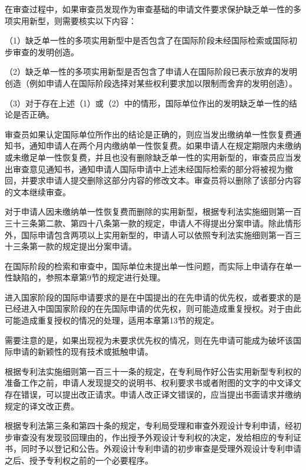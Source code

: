 在审查过程中，如果审查员发现作为审查基础的申请文件要求保护缺乏单一性的多项实用新型，则需要核实以下内容：

{\setlength{\parindent}{17.1bp}（1）缺乏单一性的多项实用新型中是否包含了在国际阶段未经国际检索或国际初步审查的发明创造。\par}

{\setlength{\parindent}{17.1bp}（2）缺乏单一性的多项实用新型是否包含了申请人在国际阶段已表示放弃的发明创造（例如申请人在国际阶段选择对某些权利要求加以限制而舍弃的发明创造）。\par}

{\setlength{\parindent}{17.1bp}（3）对于存在上述（1）或（2）中的情形，国际单位作出的发明缺乏单一性的结论是否正确。\par}

审查员如果认定国际单位所作出的结论是正确的，则应当发出缴纳单一性恢复费通知书，通知申请人在两个月内缴纳单一性恢复费。如果申请人在规定期限内未缴纳或未缴足单一性恢复费，并且也没有删除缺乏单一性的实用新型的，审查员应当发出审查意见通知书，通知申请人国际申请中上述未经国际检索的部分将被视为撤回，并要求申请人提交删除这部分内容的修改文本。审查员将以删除了该部分内容的文本继续审查。

对于申请人因未缴纳单一性恢复费而删除的实用新型，根据专利法实施细则第一百三十三条第二款、第四十八条第一款的规定，申请人不得提出分案申请。除此情形外，国际申请包含两项以上实用新型的，申请人可以依照专利法实施细则第一百三十三条第一款的规定提出分案申请。

在国际阶段的检索和审查中，国际单位未提出单一性问题，而实际上申请存在单一性缺陷的，参照本章第9节的规定进行处理。

进入国家阶段的国际申请要求的是在中国提出的在先申请的优先权，或者要求的是已经进入中国国家阶段的在先国际申请的优先权，则可能造成重复授权。对于由此可能造成重复授权的情况的处理，适用本章第13节的规定。

需要注意的是，如果出现视为未要求优先权的情况，则在先申请可能成为破坏该国际申请的新颖性的现有技术或抵触申请。

根据专利法实施细则第一百三十一条的规定，在专利局作好公告实用新型专利权的准备工作之前，申请人发现提交的说明书、权利要求书或者附图的文字的中文译文存在错误，可以提出改正请求。申请人改正译文错误的，应当提出书面请求并缴纳规定的译文改正费。

根据专利法第三条和第四十条的规定，专利局受理和审查外观设计专利申请，经初步审查没有发现驳回理由的，作出授予外观设计专利权的决定，发给相应的专利证书，同时予以登记和公告。外观设计专利申请的初步审查是受理外观设计专利申请之后、授予专利权之前的一个必要程序。

